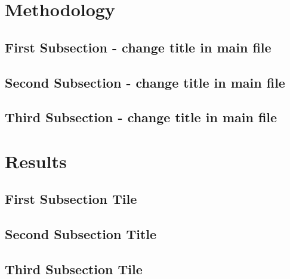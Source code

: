 \documentclass[12pt]{article}
\begin{document}
\begin{spacing}{1.5}
\section{Methodology} 

\subsection{First Subsection - change title in main file}  

\subsection{Second Subsection - change title in main file} 

\subsection{Third Subsection - change title in main file} 



\bigskip



\section{Results}

\subsection{First Subsection Tile}

\subsection{Second Subsection Title}

\subsection{Third Subsection Tile}


\newpage
\bigskip


\end{spacing}
\end{document}
